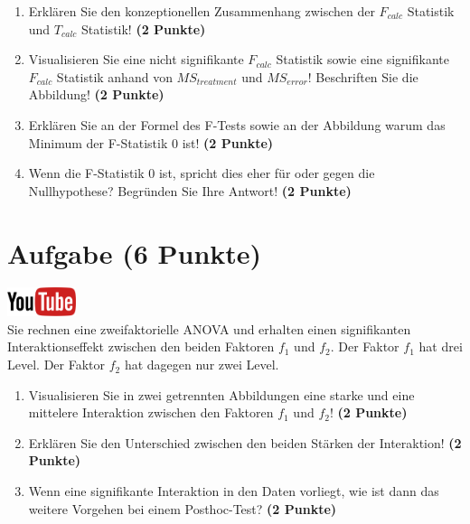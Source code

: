 \documentclass[a4paper, 10pt]{scrartcl}\usepackage[]{graphicx}\usepackage[]{xcolor}
\begin{document}
\begin{enumerate}
\item Erkl{\"a}ren Sie den konzeptionellen Zusammenhang zwischen der $F_{calc}$
  Statistik und $T_{calc}$ Statistik! \textbf{(2 Punkte)}
\item Visualisieren Sie eine nicht signifikante $F_{calc}$ Statistik sowie
  eine signifikante $F_{calc}$ Statistik anhand von $MS_{treatment}$ und
  $MS_{error}$! Beschriften Sie die Abbildung! \textbf{(2 Punkte)}
\item Erkl{\"a}ren Sie an der Formel des F-Tests sowie an der Abbildung warum
  das Minimum der F-Statistik 0 ist! \textbf{(2 Punkte)}
\item Wenn die F-Statistik 0 ist, spricht dies eher f{\"u}r oder gegen die
  Nullhypothese? Begr{\"u}nden Sie Ihre Antwort! \textbf{(2 Punkte)}
\end{enumerate}

 
\clearpage

\section{Aufgabe \hfill (6 Punkte)}

\hfill\href{https://youtu.be/2qG1Dws0MJo}{\includegraphics[width =
  2cm]{img/youtube}}\\[1Ex]


Sie rechnen eine zweifaktorielle ANOVA und erhalten einen signifikanten
Interaktionseffekt zwischen den beiden Faktoren $f_1$ und $f_2$. Der Faktor
$f_1$ hat drei Level. Der Faktor $f_2$ hat dagegen nur zwei Level.




\begin{enumerate}
\item Visualisieren Sie in zwei getrennten Abbildungen eine
  starke und eine mittelere Interaktion zwischen
  den Faktoren $f_1$ und $f_2$! \textbf{(2 Punkte)}
\item Erkl{\"a}ren Sie den Unterschied zwischen den beiden St{\"a}rken der Interaktion!
  \textbf{(2 Punkte)}
\item Wenn eine signifikante Interaktion in den Daten vorliegt, wie ist
  dann das weitere Vorgehen bei einem Posthoc-Test?
  \textbf{(2 Punkte)}
\end{enumerate}
\end{document}
